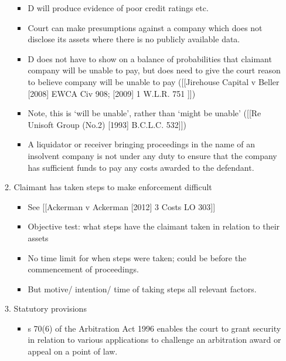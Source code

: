 \documentclass[
]{article}
\providecommand{\tightlist}{%
  \setlength{\itemsep}{0pt}\setlength{\parskip}{0pt}}
\begin{document}
\begin{enumerate}
\begin{enumerate}
    \begin{itemize}
    \tightlist
    \item
      D will produce evidence of poor credit ratings etc.
    \item
      Court can make presumptions against a company which does not
      disclose its assets where there is no publicly available data.
    \item
      D does not have to show on a balance of probabilities that
      claimant company will be unable to pay, but does need to give the
      court reason to believe company will be unable to pay
      ({[}{[}Jirehouse Capital v Beller {[}2008{]} EWCA Civ 908;
      {[}2009{]} 1 W.L.R. 751 {]}{]})
    \item
      Note, this is `will be unable', rather than `might be unable'
      ({[}{[}Re Unisoft Group (No.2) {[}1993{]} B.C.L.C. 532{]}{]})
    \item
      A liquidator or receiver bringing proceedings in the name of an
      insolvent company is not under any duty to ensure that the company
      has sufficient funds to pay any costs awarded to the defendant.
    \end{itemize}
  \item
    Claimant has taken steps to make enforcement difficult

    \begin{itemize}
    \tightlist
    \item
      See {[}{[}Ackerman v Ackerman {[}2012{]} 3 Costs LO 303{]}{]}
    \item
      Objective test: what steps have the claimant taken in relation to
      their assets
    \item
      No time limit for when steps were taken; could be before the
      commencement of proceedings.
    \item
      But motive/ intention/ time of taking steps all relevant factors.
    \end{itemize}
  \item
    Statutory provisions

    \begin{itemize}
    \tightlist
    \item
      s 70(6) of the Arbitration Act 1996 enables the court to grant
      security in relation to various applications to challenge an
      arbitration award or appeal on a point of law.
    \end{itemize}
  \end{enumerate}
\end{enumerate}
\end{document}
